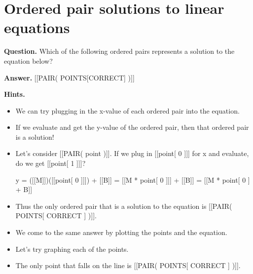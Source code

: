 \documentclass{article}
\begin{document}
\section*{Ordered pair solutions to linear equations}
\textbf{Question.} Which of the following ordered pairs represents a solution to the equation below?

\textbf{Answer.} [[PAIR( POINTS[CORRECT] )]]

\textbf{Hints.}
\begin{itemize}
  \item We can try plugging in the x-value of each ordered pair into the equation.
  \item If we evaluate and get the y-value of the ordered pair, then that ordered pair is a solution!
  \item Let's consider [[PAIR( point )]].
                            If we plug in [[point[ 0 ]]] for x and evaluate, do we get [[point[ 1 ]]]?
                        
                        y = ([[M]])([[point[ 0 ]]]) + [[B]] = [[M * point[ 0 ]]] + [[B]] = [[M * point[ 0 ] + B]]
  \item Thus the only ordered pair that is a solution to the equation is [[PAIR( POINTS[ CORRECT ] )]].
  \item We come to the same answer by plotting the points and the equation.
  \item Let's try graphing each of the points.
  \item The only point that falls on the line is [[PAIR( POINTS[ CORRECT ] )]].
\end{itemize}
\end{document}

